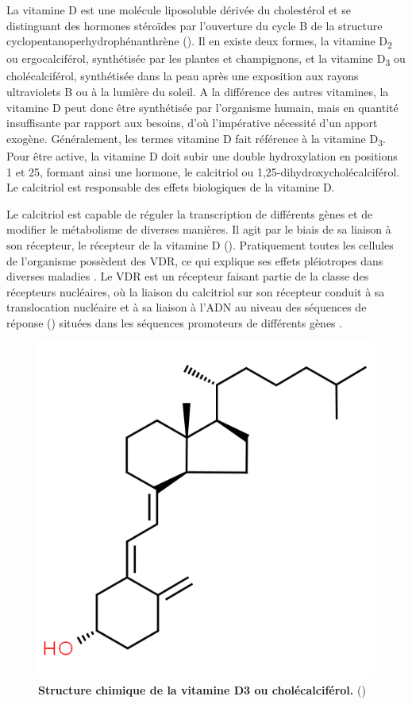 \documentclass[
  a4paper,
  DIV=11,
  numbers=noendperiod,
  listof=totoc]{scrreprt}
\begin{document}
La vitamine D est une molécule liposoluble dérivée du cholestérol et se
distinguant des hormones stéroïdes par l'ouverture du cycle B de la
structure cyclopentanoperhydrophénanthrène \autocite{Norman.2008}
(). Il en existe deux formes, la vitamine
D\textsubscript{2} ou ergocalciférol, synthétisée par les plantes et
champignons, et la vitamine D\textsubscript{3} ou cholécalciférol,
synthétisée dans la peau après une exposition aux rayons ultraviolets B
ou à la lumière du soleil. A la différence des autres vitamines, la
vitamine D peut donc être synthétisée par l'organisme humain, mais en
quantité insuffisante par rapport aux besoins, d'où l'impérative
nécessité d'un apport exogène. Généralement, les termes vitamine D fait
référence à la vitamine D\textsubscript{3}. Pour être active, la
vitamine D doit subir une double hydroxylation en positions 1 et 25,
formant ainsi une hormone, le calcitriol ou
1,25-dihydroxycholécalciférol. Le calcitriol est responsable des effets
biologiques de la vitamine D.

Le calcitriol est capable de réguler la transcription de différents
gènes et de modifier le métabolisme de diverses manières. Il agit par le
biais de sa liaison à son récepteur, le récepteur de la vitamine D
(). Pratiquement toutes les cellules de l'organisme possèdent
des \ac{VDR}, ce qui explique ses effets pléiotropes dans diverses
maladies \autocite{Ellison.2021,Caprio.2017,Norman.2008}. Le \ac{VDR}
est un récepteur faisant partie de la classe des récepteurs nucléaires,
où la liaison du calcitriol sur son récepteur conduit à sa translocation
nucléaire et à sa liaison à l'ADN au niveau des séquences de réponse
() situées dans les séquences promoteurs de différents gènes
\autocite{Bouillon.2008}.

\begin{figure}
\centering
\includegraphics[width=0.7\columnwidth]{figures/cholecalciferol-chemspider.png} 
\caption[Structure chimique de la vitamine D3 ou cholécalciférol.]{\textbf{Structure chimique de la vitamine D3 ou cholécalciférol.} (\cite{chemspider.2023})}
\label{fig:vitd3}
\end{figure}
\end{document}
